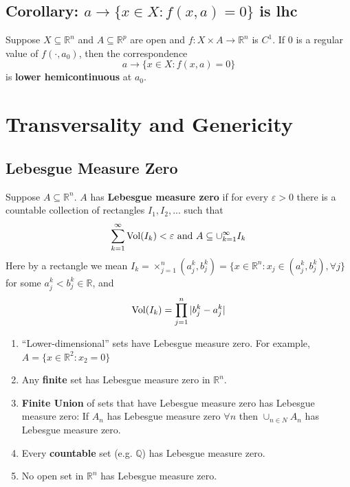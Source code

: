 \documentclass[11pt]{elegantbook}
\begin{document}
\subsection{Corollary: $a \rightarrow \{x\in X: f(x,a)=0\}$ is lhc}
\begin{corollary}
    Suppose $X \subseteq \mathbb{R}^n$ and $A \subseteq \mathbb{R}^p$ are open and $f : X \times A \rightarrow \mathbb{R}^n$ is $C^1$. If $0$ is a regular value of $f(\cdot, a_0)$, then the correspondence $$a \rightarrow \{x\in X: f(x,a)=0\}$$
    is \textbf{lower hemicontinuous} at $a_0$.
\end{corollary}

\section{Transversality and Genericity}
\subsection{Lebesgue Measure Zero}
\begin{definition}
    \normalfont
    Suppose $A \subseteq \mathbb{R}^n$. $A$ has \textbf{Lebesgue measure zero} if for every $\varepsilon > 0$ there is a countable collection of rectangles $I_1, I_2, . . .$ such that
    \begin{equation}
        \begin{aligned}
            \sum_{k=1}^\infty\textnormal{Vol}(I_k)<\varepsilon \textnormal{ and }A\subseteq \cup_{k=1}^\infty I_k
        \end{aligned}
        \nonumber
    \end{equation}
    Here by a rectangle we mean $I_k = \times^n_{j=1}(a^k_j , b^k_j)=\{x\in \mathbb{R}^n: x_j\in (a^k_j , b^k_j), \forall j\}$ for some $a^k_j < b^k_j \in \mathbb{R}$, and
    \begin{equation}
        \begin{aligned}
            \textnormal{Vol}(I_k)=\prod_{j=1}^n|b^k_j-a^k_j|
        \end{aligned}
        \nonumber
    \end{equation}
\end{definition}

\begin{example}
    \begin{enumerate}
        \item “Lower-dimensional” sets have Lebesgue measure zero. For example, $A=\{x\in\mathbb{R}^2:x_2=0\}$
        \item Any \textbf{finite} set has Lebesgue measure zero in $\mathbb{R}^n$.
        \item \textbf{Finite Union} of sets that have Lebesgue measure zero has Lebesgue measure zero: If $A_n$ has Lebesgue measure zero $\forall n$ then $\cup_{n\in N}A_n$ has Lebesgue measure zero.
        \item Every \textbf{countable} set (e.g. $\mathbb{Q}$) has Lebesgue measure zero.
        \item No open set in $\mathbb{R}^n$ has Lebesgue measure zero.
    \end{enumerate}
\end{example}
\end{document}
